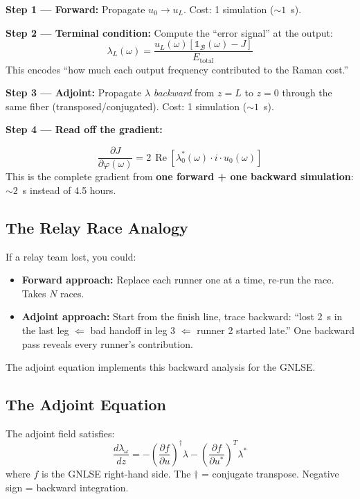 \documentclass[12pt,a4paper]{article}
\newcommand{\Real}{\operatorname{Re}}
\newcommand{\pdv}[2]{\frac{\partial #1}{\partial #2}}
\newcommand{\dv}[2]{\frac{d #1}{d #2}}
\begin{document}
\textbf{Step 1 --- Forward:} Propagate $u_0 \to u_L$. Cost: 1 simulation (${\sim}1$~s).

\textbf{Step 2 --- Terminal condition:} Compute the ``error signal'' at the output:
\begin{equation}
\lambda_L(\omega) = \frac{u_L(\omega)\left[\mathbb{1}_\mathcal{B}(\omega) - J\right]}{E_{\text{total}}}
\label{eq:terminal}
\end{equation}
This encodes ``how much each output frequency contributed to the Raman cost.''

\textbf{Step 3 --- Adjoint:} Propagate $\lambda$ \emph{backward} from $z=L$ to $z=0$ through the same fiber (transposed/conjugated). Cost: 1 simulation (${\sim}1$~s).

\textbf{Step 4 --- Read off the gradient:}
\begin{keyeq}
\begin{equation}
\boxed{\pdv{J}{\varphi(\omega)} = 2\,\Real\!\left[\lambda_0^*(\omega)\cdot i\cdot u_0(\omega)\right]}
\label{eq:gradient}
\end{equation}
This is the complete gradient from \textbf{one forward + one backward simulation}: ${\sim}2$~s instead of 4.5 hours.
\end{keyeq}

\subsection{The Relay Race Analogy}

If a relay team lost, you could:
\begin{itemize}
    \item \textbf{Forward approach:} Replace each runner one at a time, re-run the race. Takes $N$ races.
    \item \textbf{Adjoint approach:} Start from the finish line, trace backward: ``lost 2~s in the last leg $\Leftarrow$ bad handoff in leg 3 $\Leftarrow$ runner 2 started late.'' One backward pass reveals every runner's contribution.
\end{itemize}

The adjoint equation implements this backward analysis for the GNLSE.

\subsection{The Adjoint Equation}

The adjoint field satisfies:
\begin{equation}
\dv{\lambda_\omega}{z} = -\left(\pdv{f}{u}\right)^\dagger \lambda - \left(\pdv{f}{u^*}\right)^T \lambda^*
\label{eq:adjoint}
\end{equation}
where $f$ is the GNLSE right-hand side. The $\dagger$ = conjugate transpose. Negative sign = backward integration.
\end{document}
